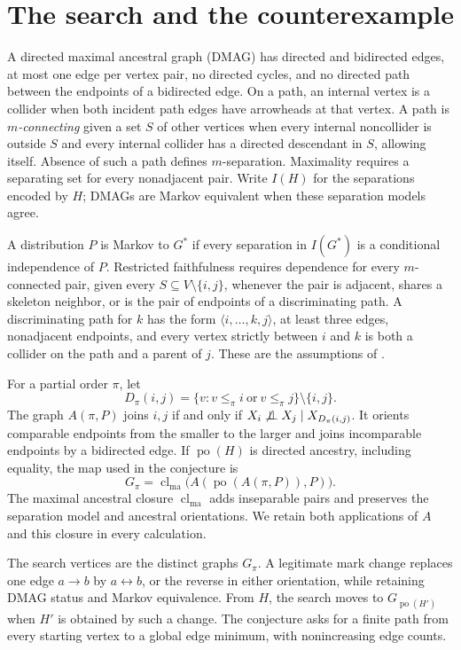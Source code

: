 \documentclass[11pt]{article}
\newcommand{\po}{\operatorname{po}}
\newcommand{\clma}{\operatorname{cl}_{\mathrm{ma}}}
\newcommand{\bidir}{\leftrightarrow}
\newcommand{\indep}{\mathrel{\perp\!\!\!\perp}}
\begin{document}
\section{The search and the counterexample}\label{sec:setup}
A directed maximal ancestral graph (DMAG) has directed and bidirected edges,
at most one edge per vertex pair, no directed cycles, and no directed path
between the endpoints of a bidirected edge. On a path, an internal vertex is
a collider when both incident path edges have arrowheads at that vertex.
A path is \emph{$m$-connecting} given a set $S$ of other vertices when every
internal noncollider is outside $S$ and every internal collider has a directed
descendant in $S$, allowing itself. Absence of such a path defines
$m$-separation. Maximality requires a separating set for every nonadjacent
pair. Write $I(H)$ for the separations encoded by $H$; DMAGs are Markov
equivalent when these separation models agree.

A distribution $P$ is Markov to $G^*$ if every separation in $I(G^*)$ is a
conditional independence of $P$. Restricted faithfulness requires dependence
for every $m$-connected pair, given every $S\subseteq V\setminus\{i,j\}$,
whenever the pair is adjacent, shares a skeleton neighbor, or is the pair of
endpoints of a discriminating path. A discriminating path for $k$ has the
form $\langle i,\ldots,k,j\rangle$, at least three edges, nonadjacent
endpoints, and every vertex strictly between $i$ and $k$ is both a collider
on the path and a parent of $j$. These are the assumptions of
\cite[Definition 1]{BS20}.

For a partial order $\pi$, let
\[
D_\pi(i,j)=\{v:v\le_\pi i\ \text{or}\ v\le_\pi j\}\setminus\{i,j\}.
\]
The graph $A(\pi,P)$ joins $i,j$ if and only if
$X_i\not\indep X_j\mid X_{D_\pi(i,j)}$. It orients comparable endpoints
from the smaller to the larger and joins incomparable endpoints by a
bidirected edge. If $\po(H)$ is directed ancestry, including equality, the
map used in the conjecture is
\begin{equation}\label{eq:map}
G_\pi=\clma\bigl(A(\po(A(\pi,P)),P)\bigr).
\end{equation}
The maximal ancestral closure $\clma$ adds inseparable pairs and preserves
the separation model and ancestral orientations. We retain both applications
of $A$ and this closure in every calculation.

The search vertices are the distinct graphs $G_\pi$. A legitimate mark
change replaces one edge $a\to b$ by $a\bidir b$, or the reverse in either
orientation, while retaining DMAG status and Markov equivalence. From $H$,
the search moves to $G_{\po(H')}$ when $H'$ is obtained by such a change.
The conjecture asks for a finite path from every starting vertex to a global
edge minimum, with nonincreasing edge counts.
\end{document}
